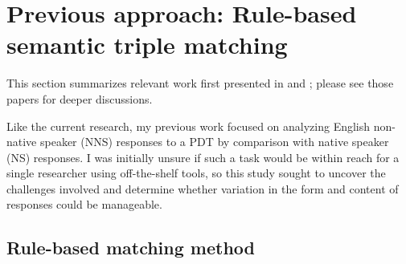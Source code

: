 \section{Previous approach: Rule-based semantic triple matching}
\label{sec:first-approaches}
This section summarizes relevant work first presented in \citet{king:dickinson:13} and \citet{king:dickinson:14}; please see those papers for deeper discussions.

Like the current research, my previous work focused on analyzing English non-native speaker (NNS) responses to a PDT by comparison with native speaker (NS) responses. I was initially unsure if such a task would be within reach for a single researcher using off-the-shelf tools, so this study sought to uncover the challenges involved and determine whether variation in the form and content of responses could be manageable.



\subsection{Rule-based matching method}
\label{sec:rule-method}

